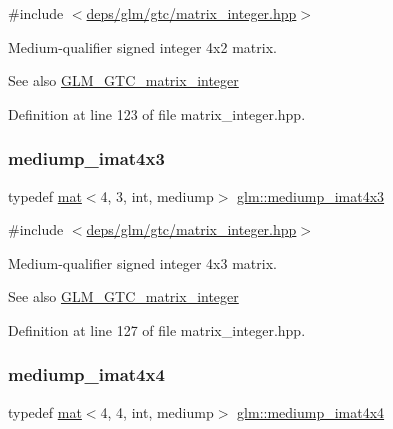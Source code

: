 {\ttfamily \#include $<$\hyperlink{matrix__integer_8hpp}{deps/glm/gtc/matrix\+\_\+integer.\+hpp}$>$}

Medium-\/qualifier signed integer 4x2 matrix. \begin{DoxySeeAlso}{See also}
\hyperlink{group__gtc__matrix__integer}{G\+L\+M\+\_\+\+G\+T\+C\+\_\+matrix\+\_\+integer} 
\end{DoxySeeAlso}


Definition at line 123 of file matrix\+\_\+integer.\+hpp.

\mbox{\label{group__gtc__matrix__integer_ga213644b63e6ee8ac783fd9a75e3c5abb}} 
\subsubsection{\texorpdfstring{mediump\+\_\+imat4x3}{mediump\_imat4x3}}
{\footnotesize\ttfamily typedef \hyperlink{structglm_1_1mat}{mat}$<$4, 3, int, mediump$>$ \hyperlink{group__gtc__matrix__integer_ga213644b63e6ee8ac783fd9a75e3c5abb}{glm\+::mediump\+\_\+imat4x3}}



{\ttfamily \#include $<$\hyperlink{matrix__integer_8hpp}{deps/glm/gtc/matrix\+\_\+integer.\+hpp}$>$}

Medium-\/qualifier signed integer 4x3 matrix. \begin{DoxySeeAlso}{See also}
\hyperlink{group__gtc__matrix__integer}{G\+L\+M\+\_\+\+G\+T\+C\+\_\+matrix\+\_\+integer} 
\end{DoxySeeAlso}


Definition at line 127 of file matrix\+\_\+integer.\+hpp.

\mbox{\label{group__gtc__matrix__integer_gaf45ac606a3fb21f46228524d1d322eb2}} 
\subsubsection{\texorpdfstring{mediump\+\_\+imat4x4}{mediump\_imat4x4}}
{\footnotesize\ttfamily typedef \hyperlink{structglm_1_1mat}{mat}$<$4, 4, int, mediump$>$ \hyperlink{group__gtc__matrix__integer_gaf45ac606a3fb21f46228524d1d322eb2}{glm\+::mediump\+\_\+imat4x4}}



